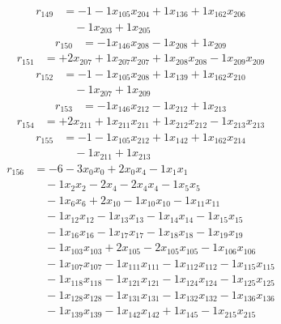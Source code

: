 \[\begin{aligned}
r_{149} &= - 1 - 1 x_{105} x_{204} + 1 x_{136} + 1 x_{162} x_{206} \\
 &\quad - 1 x_{203} + 1 x_{205}
\end{aligned}\]
\[\begin{aligned}
r_{150} &= - 1 x_{146} x_{208} - 1 x_{208} + 1 x_{209}
\end{aligned}\]
\[\begin{aligned}
r_{151} &= + 2 x_{207} + 1 x_{207} x_{207} + 1 x_{208} x_{208} - 1 x_{209} x_{209}
\end{aligned}\]
\[\begin{aligned}
r_{152} &= - 1 - 1 x_{105} x_{208} + 1 x_{139} + 1 x_{162} x_{210} \\
 &\quad - 1 x_{207} + 1 x_{209}
\end{aligned}\]
\[\begin{aligned}
r_{153} &= - 1 x_{146} x_{212} - 1 x_{212} + 1 x_{213}
\end{aligned}\]
\[\begin{aligned}
r_{154} &= + 2 x_{211} + 1 x_{211} x_{211} + 1 x_{212} x_{212} - 1 x_{213} x_{213}
\end{aligned}\]
\[\begin{aligned}
r_{155} &= - 1 - 1 x_{105} x_{212} + 1 x_{142} + 1 x_{162} x_{214} \\
 &\quad - 1 x_{211} + 1 x_{213}
\end{aligned}\]
\[\begin{aligned}
r_{156} &= - 6 - 3 x_{0} x_{0} + 2 x_{0} x_{4} - 1 x_{1} x_{1} \\
 &\quad - 1 x_{2} x_{2} - 2 x_{4} - 2 x_{4} x_{4} - 1 x_{5} x_{5} \\
 &\quad - 1 x_{6} x_{6} + 2 x_{10} - 1 x_{10} x_{10} - 1 x_{11} x_{11} \\
 &\quad - 1 x_{12} x_{12} - 1 x_{13} x_{13} - 1 x_{14} x_{14} - 1 x_{15} x_{15} \\
 &\quad - 1 x_{16} x_{16} - 1 x_{17} x_{17} - 1 x_{18} x_{18} - 1 x_{19} x_{19} \\
 &\quad - 1 x_{103} x_{103} + 2 x_{105} - 2 x_{105} x_{105} - 1 x_{106} x_{106} \\
 &\quad - 1 x_{107} x_{107} - 1 x_{111} x_{111} - 1 x_{112} x_{112} - 1 x_{115} x_{115} \\
 &\quad - 1 x_{118} x_{118} - 1 x_{121} x_{121} - 1 x_{124} x_{124} - 1 x_{125} x_{125} \\
 &\quad - 1 x_{128} x_{128} - 1 x_{131} x_{131} - 1 x_{132} x_{132} - 1 x_{136} x_{136} \\
 &\quad - 1 x_{139} x_{139} - 1 x_{142} x_{142} + 1 x_{145} - 1 x_{215} x_{215}
\end{aligned}\]
